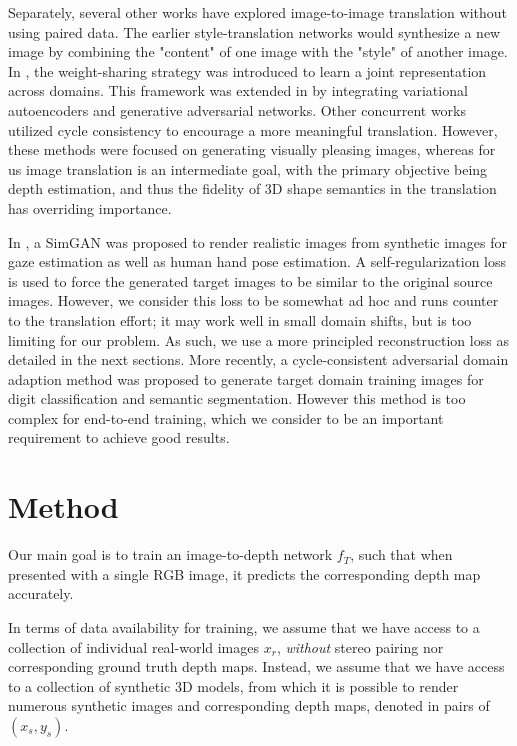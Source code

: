 \documentclass[runningheads]{llncs}
\begin{document}
Separately, several other works have explored image-to-image translation without using paired data. The earlier style-translation networks \cite{gatys2016image,johnson2016perceptual} would synthesize a new image by combining the "content" of one image with the "style" of another image. 
In \cite{liu2016coupled}, the weight-sharing strategy was introduced to learn a joint representation across domains. This framework was extended in \cite{liu2017unsupervised} by integrating variational autoencoders and generative adversarial networks. Other concurrent works \cite{zhu2017unpaired,kim2017learning,yi2017dualgan} utilized cycle consistency to encourage a more meaningful translation. However, these methods were focused on generating visually pleasing images, whereas for us image translation is an intermediate goal, with the primary objective being depth estimation, and thus the fidelity of 3D shape semantics in the translation has overriding importance.

In \cite{shrivastava2017learning}, a SimGAN was proposed to render realistic images from synthetic images for gaze estimation as well as human hand pose estimation. A self-regularization loss is used to force the generated target images to be similar to the original source images. However, we consider this loss to be somewhat ad hoc and runs counter to the translation effort; it may work well in small domain shifts, but is too limiting for our problem. As such, we use a more principled reconstruction loss as detailed in the next sections. More recently, a cycle-consistent adversarial domain adaption method was proposed \cite{hoffman2017cycada} to generate target domain training images for digit classification and semantic segmentation. However this method is too complex for end-to-end training, which we consider to be an important requirement to achieve good results.

\section{Method}

Our main goal is to train an image-to-depth network $f_T$, such that when presented with a single RGB image, it predicts the corresponding depth map accurately.

In terms of data availability for training, we assume that we have access to a collection of individual real-world images $x_r$, \emph{without} stereo pairing nor corresponding ground truth depth maps. Instead, we assume that we have access to a collection of synthetic 3D models, from which it is possible to render numerous synthetic images and corresponding depth maps, denoted in pairs of $(x_s, y_s)$.
\end{document}
